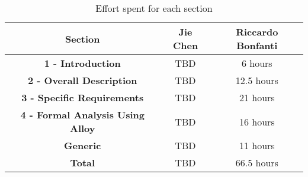 \begin{table}[H]
    \centering
    \begin{tabular}{|c|c|c|}
    \hline
    \rowcolor{bluepoli!40}
    \textbf{Section} & \textbf{Jie Chen} & \textbf{Riccardo Bonfanti} \T\B \\
    \hline
     \textbf{1 - Introduction}                  & TBD & 6 hours \T\B \\
     \textbf{2 - Overall Description}           & TBD & 12.5 hours \T\B\\
     \textbf{3 - Specific Requirements}         & TBD & 21 hours \T\B\\
     \textbf{4 - Formal Analysis Using Alloy}   & TBD & 16 hours  \T\B \\
     \textbf{Generic}                           & TBD & 11 hours \T\B \\
     \hline
     \textbf{Total}                             & TBD & 66.5 hours \T\B \\

    \hline
    \end{tabular}
    \\[10pt]
    \caption{Effort spent for each section}
    \label{table:effort}
\end{table}